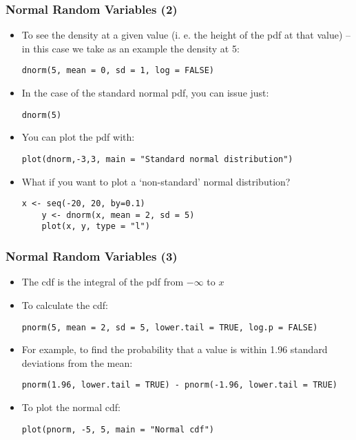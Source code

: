 \documentclass[10pt]{beamer}
\theoremstyle{definition}
\begin{document}
\begin{frame}[fragile]
\frametitle{Normal Random Variables (2)}
\begin{itemize}
	\item To see the density at a given value (i. e. the height of the pdf at that value) -- in this case we take as an example the density at 5:
	\begin{lstlisting}[style = rstyle, breaklines]
	dnorm(5, mean = 0, sd = 1, log = FALSE)	
	\end{lstlisting}
	
	\item In the case of the standard normal pdf, you can issue just:
	\begin{lstlisting}[style = rstyle, breaklines]
	dnorm(5)
	\end{lstlisting}
	
	\item You can plot the pdf with:
	\begin{lstlisting}[style = rstyle, breaklines]
	plot(dnorm,-3,3, main = "Standard normal distribution")
	\end{lstlisting}

	\item What if you want to plot a `non-standard' normal distribution?
	\begin{lstlisting}[style = rstyle, breaklines]
	x <- seq(-20, 20, by=0.1)
	y <- dnorm(x, mean = 2, sd = 5)
	plot(x, y, type = "l")
	\end{lstlisting}
\end{itemize}
\end{frame}

\begin{frame}[fragile]
\frametitle{Normal Random Variables (3)}
\begin{itemize}
	\item The cdf is the integral of the pdf from $-\infty$ to $x$
	
	\item To calculate the cdf:
	\begin{lstlisting}[style = rstyle, breaklines]
	pnorm(5, mean = 2, sd = 5, lower.tail = TRUE, log.p = FALSE)
	\end{lstlisting}
	
	\item For example, to find the probability that a value is within 1.96 standard deviations from the mean:
	\begin{lstlisting}[style = rstyle, breaklines]
	pnorm(1.96, lower.tail = TRUE) - pnorm(-1.96, lower.tail = TRUE)
	\end{lstlisting}

	\item To plot the normal cdf:
	\begin{lstlisting}[style = rstyle, breaklines]
	plot(pnorm, -5, 5, main = "Normal cdf")
	\end{lstlisting}
\end{itemize}
\end{frame}
\end{document}
